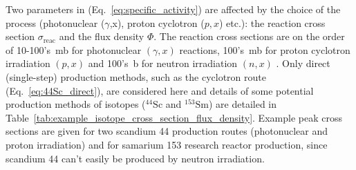 \documentclass[../main.tex]{subfiles}
\begin{document}
Two parameters in (Eq.~\ref{eq:specific_activity}) are affected by the choice of the process (photonuclear ($\gamma$,x), proton cyclotron ($p,x$) etc.): the reaction cross section $\sigma_{\mathrm{reac}}$ and the flux density $\Phi$. The reaction cross sections are on the order of 10-100's~\si{\milli\barn} for photonuclear $\left(\gamma,x\right)$ reactions, 100's~\si{\milli\barn} for proton cyclotron irradiation $\left(p,x\right)$ and 100's~\si{\barn} for neutron irradiation $\left(n,x\right)$ \cite{zerkin2018experimental}. Only direct (single-step) production methods, such as the cyclotron route (Eq.~\ref{eq:44Sc_direct}), are considered here and details of some potential production methods of isotopes ($^{44}\mathrm{Sc}$ and $^{153}\mathrm{Sm}$) are detailed in Table~\ref{tab:example_isotope_cross_section_flux_density}. Example peak cross sections are given for two scandium 44 production routes (photonuclear and proton irradiation) and for samarium 153 research reactor production, since scandium 44 can't easily be produced by neutron irradiation.
\end{document}
